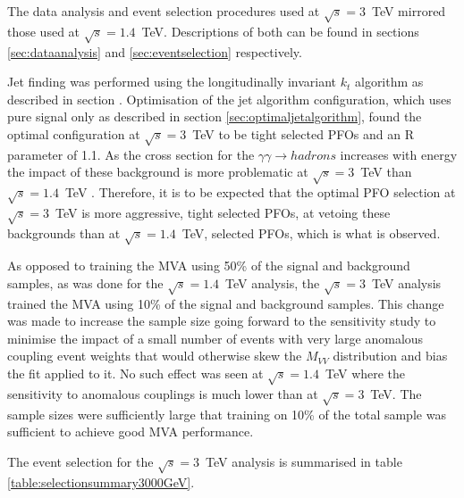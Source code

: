 The data analysis and event selection procedures used at $\sqrt{s}=3$~TeV mirrored those used at $\sqrt{s}=1.4$~TeV.  Descriptions of both can be found in sections \ref{sec:dataanalysis} and \ref{sec:eventselection} respectively.  

Jet finding was performed using the longitudinally invariant $k_{t}$ algorithm as described in section \label{sec:jetpairing}.  Optimisation of the jet algorithm configuration, which uses pure signal only as described in section \ref{sec:optimaljetalgorithm}, found the optimal configuration at $\sqrt{s}=3$~TeV to be tight selected PFOs and an R parameter of 1.1.  As the cross section for the $\gamma\gamma \rightarrow hadrons$ increases with energy the impact of these background is more problematic at $\sqrt{s}=3$~TeV than $\sqrt{s}=1.4$~TeV \cite{arXiv:1209.4039}.  Therefore, it is to be expected that the optimal PFO selection at $\sqrt{s}=3$~TeV is more aggressive, tight selected PFOs, at vetoing these backgrounds than at $\sqrt{s}=1.4$~TeV, selected PFOs, which is what is observed.   

As opposed to training the MVA using 50\% of the signal and background samples, as was done for the $\sqrt{s}=1.4$~TeV analysis, the $\sqrt{s}=3$~TeV analysis trained the MVA using 10\% of the signal and background samples.  This change was made to increase the sample size going forward to the sensitivity study to minimise the impact of a small number of events with very large anomalous coupling event weights that would otherwise skew the $M_{VV}$ distribution and bias the fit applied to it.  No such effect was seen at $\sqrt{s}=1.4$~TeV where the sensitivity to anomalous couplings is much lower than at $\sqrt{s}=3$~TeV.  The sample sizes were sufficiently large that training on 10\% of the total sample was sufficient to achieve good MVA performance.  

The event selection for the $\sqrt{s}=3$~TeV analysis is summarised in table \ref{table:selectionsummary3000GeV}.

